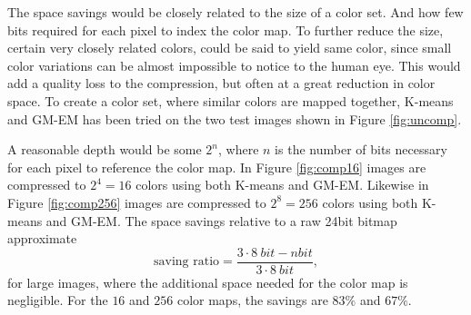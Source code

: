 \documentclass[a4paper,10pt,article,oneside,english]{memoir}
\begin{document}
The space savings would be closely related to the size of a color set. And how few bits required for each pixel to index the color map. To further reduce the size, certain very closely related colors, could be said to yield same color, since small color variations can be almost impossible to notice to the human eye. This would add a quality loss to the compression, but often at a great reduction in color space. To create a color set, where similar colors are mapped together, K-means and GM-EM has been tried on the two test images shown in Figure \ref{fig:uncomp}. 

A reasonable depth would be some $2^n$, where $n$ is the number of bits necessary for each pixel to reference the color map. In Figure \ref{fig:comp16} images are compressed to $2^4=16$ colors using both K-means and GM-EM. Likewise in Figure \ref{fig:comp256} images are compressed to $2^8=256$ colors using both K-means and GM-EM. The space savings relative to a raw 24bit bitmap approximate 
$$\text{saving ratio} = \frac{3 \cdot \SI{8}{bit}- n \si{bit}}{3 \cdot\SI{8}{bit}},$$
for large images, where the additional space needed for the color map is negligible. For the $16$ and $256$ color maps, the savings are $83\%$ and $67\%$. 
\end{document}
